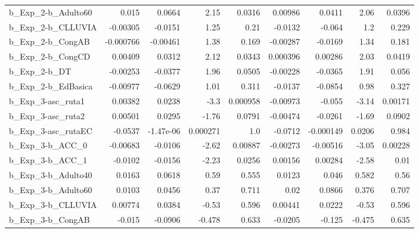 \begin{tabular}{lrrrrrrrr}
b\_Exp\_2-b\_Adulto60         &       0.015 &       0.0664 &      2.15 &   0.0316 &    0.00986 &      0.0411 &         2.06 &        0.0396 \\
b\_Exp\_2-b\_CLLUVIA          &    -0.00305 &      -0.0151 &      1.25 &     0.21 &    -0.0132 &      -0.064 &          1.2 &         0.229 \\
b\_Exp\_2-b\_CongAB           &   -0.000766 &     -0.00461 &      1.38 &    0.169 &   -0.00287 &     -0.0169 &         1.34 &         0.181 \\
b\_Exp\_2-b\_CongCD           &     0.00409 &       0.0312 &      2.12 &   0.0343 &   0.000396 &     0.00286 &         2.03 &        0.0419 \\
b\_Exp\_2-b\_DT               &    -0.00253 &      -0.0377 &      1.96 &   0.0505 &   -0.00228 &     -0.0365 &         1.91 &         0.056 \\
b\_Exp\_2-b\_EdBasica         &    -0.00977 &      -0.0629 &      1.01 &    0.311 &    -0.0137 &     -0.0854 &         0.98 &         0.327 \\
b\_Exp\_3-asc\_ruta1          &     0.00382 &       0.0238 &      -3.3 & 0.000958 &   -0.00973 &      -0.055 &        -3.14 &       0.00171 \\
b\_Exp\_3-asc\_ruta2          &     0.00501 &       0.0295 &     -1.76 &   0.0791 &   -0.00474 &     -0.0261 &        -1.69 &        0.0902 \\
b\_Exp\_3-asc\_rutaEC         &     -0.0537 &    -1.47e-06 &  0.000271 &      1.0 &    -0.0712 &   -0.000149 &       0.0206 &         0.984 \\
b\_Exp\_3-b\_ACC\_0            &    -0.00683 &      -0.0106 &     -2.62 &  0.00887 &   -0.00273 &    -0.00516 &        -3.05 &       0.00228 \\
b\_Exp\_3-b\_ACC\_1            &     -0.0102 &      -0.0156 &     -2.23 &   0.0256 &    0.00156 &     0.00284 &        -2.58 &          0.01 \\
b\_Exp\_3-b\_Adulto40         &      0.0163 &       0.0618 &      0.59 &    0.555 &     0.0123 &       0.046 &        0.582 &          0.56 \\
b\_Exp\_3-b\_Adulto60         &      0.0103 &       0.0456 &      0.37 &    0.711 &       0.02 &      0.0866 &        0.376 &         0.707 \\
b\_Exp\_3-b\_CLLUVIA          &     0.00774 &       0.0384 &     -0.53 &    0.596 &    0.00441 &      0.0222 &        -0.53 &         0.596 \\
b\_Exp\_3-b\_CongAB           &      -0.015 &      -0.0906 &    -0.478 &    0.633 &    -0.0205 &      -0.125 &       -0.475 &         0.635 \\

\end{tabular}

